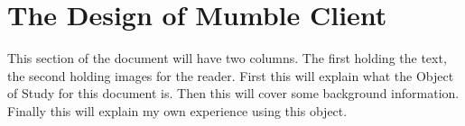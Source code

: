 \documentclass[twoside, titlepage]{article}
\title{\mytitle}
\author{\myname}
\date{\today}
\newcommand{\OOS}{Mumble Client}
\newcommand{\mytitle}{An Assesment of the Design Quality and Usability of \OOS}
\newcommand{\myname}{Timothy Heath}
\begin{document}
	\section*{The Design of \OOS}
	This section of the document will have
	two columns. The first holding the text,
	the second holding images for the reader.
	First this will explain what the Object
	of Study for this document is. Then this
	will cover some background information.
	Finally this will explain my own experience
	using this object.\newpage
\end{document}
